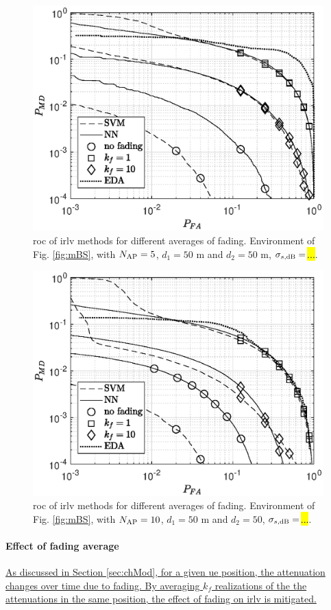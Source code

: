 \documentclass[draftcls,onecolumn,12pt]{IEEEtran}
\begin{document}

\begin{figure}[t]
    \centering
    \includegraphics[width=0.6\columnwidth]{res_fading_5BS_2Class.eps}
    \caption{\ac{roc} of \ac{irlv} methods for different averages of fading. Environment of Fig. \ref{fig:mBS}, with  $N_{\rm AP}=5$, $d_1 = 50 $ m and $d_2 = 50$ m, $\sigma_{s,{\rm dB}} = $\hl{...}.}
    \label{fig:kf10-5}
\end{figure}


\begin{figure}[t]
    \centering
    \includegraphics[width=0.6\columnwidth]{res_fading_10BS_2Class.eps}
    \caption{\ac{roc} of \ac{irlv} methods for different averages of fading. Environment of Fig. \ref{fig:mBS}, with  $N_{\rm AP}=10$, $d_1 = 50$ m and $d_2 = 50$, $\sigma_{s,{\rm dB}} = $\hl{...}.}
    \label{fig:kf10}
\end{figure}


\paragraph{Effect of fading average}  \uline{As discussed in Section \ref{sec:chMod}, for a given \ac{ue} position, the attenuation changes over time due to fading. By averaging  $k_f$ realizations of the the attenuations in the same position, the effect of fading on \ac{irlv} is mitigated. }  
\end{document}
